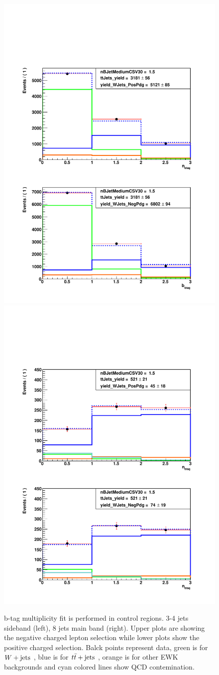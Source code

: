 \begin{figure}[!hbt]
    \begin{center}
 \includegraphics[width=0.48 \textwidth]{Plots/analysis/signalRegions/34jets}
 \includegraphics[width=0.48 \textwidth]{Plots/analysis/signalRegions/8jets}
  \caption{ \label{fig:btagmult} b-tag multiplicity fit is performed in control regions. 3-4 jets sideband (left), 8 jets main band (right). Upper plots are showing the negative charged lepton selection while lower plots show the positive charged selection. Balck points represent data, green is for $W+\textrm{jets}$ , blue is for $t\bar{t}+\textrm{jets}$ , orange is for other EWK backgrounds and  cyan colored lines show QCD contemination.
 }
  \end{center}
\end{figure}
